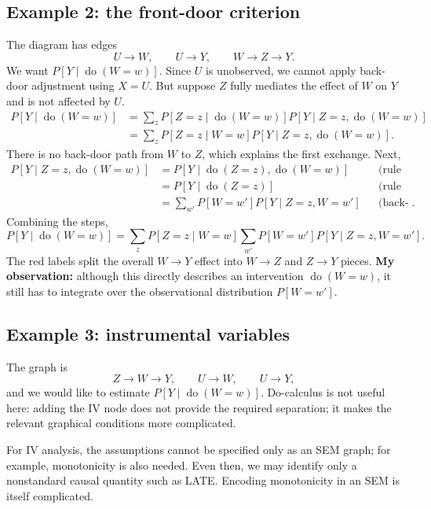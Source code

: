\subsection{Example 2: the front-door criterion}
The diagram has edges
\[
 U\to W,\qquad U\to Y,\qquad W\to Z\to Y.
\]
We want $P[Y\mid\operatorname{do}(W=w)]$. Since $U$ is unobserved, we cannot apply back-door adjustment using $X=U$. But suppose $Z$ fully mediates the effect of $W$ on $Y$ and is not affected by $U$.
\begin{align*}
 P[Y\mid\operatorname{do}(W=w)]
 &=\sum_zP[Z=z\mid\operatorname{do}(W=w)]
 P[Y\mid Z=z,\operatorname{do}(W=w)]\\
 &=\sum_zP[Z=z\mid W=w]
 P[Y\mid Z=z,\operatorname{do}(W=w)].
\end{align*}
There is no back-door path from $W$ to $Z$, which explains the first exchange. Next,
\begin{align*}
 P[Y\mid Z=z,\operatorname{do}(W=w)]
 &=P[Y\mid\operatorname{do}(Z=z),\operatorname{do}(W=w)]
 &&\text{(rule 2)}\\
 &=P[Y\mid\operatorname{do}(Z=z)]&&\text{(rule 3)}\\
 &=\sum_{w'}P[W=w']P[Y\mid Z=z,W=w']&&\text{(back-door)}.
\end{align*}
Combining the steps,
\[
 P[Y\mid\operatorname{do}(W=w)]
 =\sum_zP[Z=z\mid W=w]
 \sum_{w'}P[W=w']P[Y\mid Z=z,W=w'].\tag{13.11}
\]
The red labels split the overall $W\to Y$ effect into $W\to Z$ and $Z\to Y$ pieces.
\textbf{My observation:} although this directly describes an intervention $\operatorname{do}(W=w)$, it still has to integrate over the observational distribution $P[W=w']$.

\subsection{Example 3: instrumental variables}
The graph is
\[
 Z\to W\to Y,\qquad U\to W,\qquad U\to Y,
\]
and we would like to estimate $P[Y\mid\operatorname{do}(W=w)]$. Do-calculus is not useful here: adding the IV node does not provide the required separation; it makes the relevant graphical conditions more complicated.

For IV analysis, the assumptions cannot be specified only as an SEM graph; for example, monotonicity is also needed. Even then, we may identify only a nonstandard causal quantity such as LATE. Encoding monotonicity in an SEM is itself complicated.

